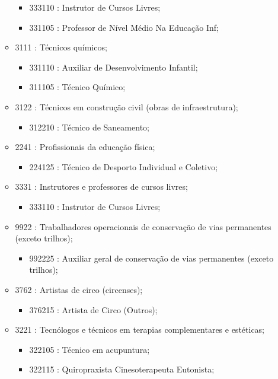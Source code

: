 \begin{itemize}
\begin{itemize}
\begin{itemize}
      \item 333110 : Instrutor de Cursos Livres;
      \item 331105 : Professor de Nível Médio Na Educação Inf;
    \end{itemize}
    \item 3111 : Técnicos químicos;
    \begin{itemize}
      \item 331110 : Auxiliar de Desenvolvimento Infantil;
      \item 311105 : Técnico Químico;
    \end{itemize}
    \item 3122 : Técnicos em construção civil (obras de infraestrutura);
    \begin{itemize}
      \item 312210 : Técnico de Saneamento;
    \end{itemize}
    \item 2241 : Profissionais da educação física;
    \begin{itemize}
      \item 224125 : Técnico de Desporto Individual e Coletivo;
    \end{itemize}
    \item 3331 : Instrutores e professores de cursos livres;
    \begin{itemize}
      \item 333110 : Instrutor de Cursos Livres;
    \end{itemize}
    \item 9922 : Trabalhadores operacionais de conservação de vias permanentes (exceto trilhos);
    \begin{itemize}
      \item 992225 : Auxiliar geral de conservação de vias permanentes (exceto trilhos);
    \end{itemize}
    \item 3762 : Artistas de circo (circenses);
    \begin{itemize}
      \item 376215 : Artista de Circo (Outros);
    \end{itemize}
    \item 3221 : Tecnólogos e técnicos em terapias complementares e estéticas;
    \begin{itemize}
      \item 322105 : Técnico em acupuntura;
      \item 322115 : Quiropraxista Cinesoterapeuta Eutonista;

\end{itemize}
\end{itemize}
\end{itemize}
